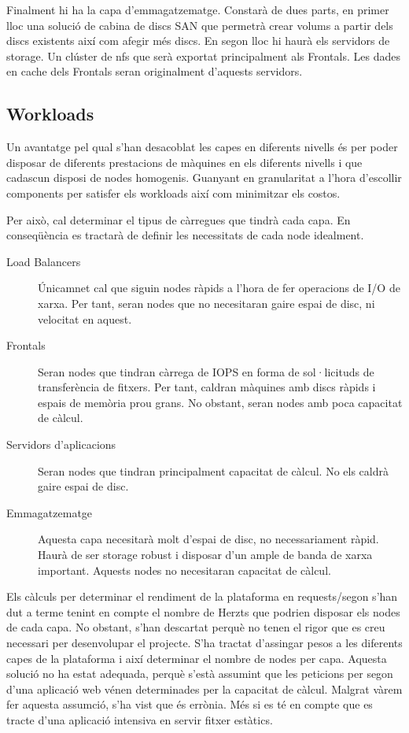 \documentclass[a4paper, 11pt]{article}
\begin{document}
Finalment hi ha la capa d'emmagatzematge. Constarà de dues parts, en primer lloc una solució de cabina de discs SAN que permetrà crear volums a partir dels discs existents així com afegir més discs. En segon lloc hi haurà els servidors de storage. Un clúster de nfs que serà exportat principalment als Frontals. Les dades en cache dels Frontals seran originalment d'aquests servidors.


\subsection{Workloads}

Un avantatge pel qual s'han desacoblat les capes en diferents nivells és per poder disposar de diferents prestacions de màquines en els diferents nivells i que cadascun disposi de nodes homogenis. Guanyant en granularitat a l'hora d'escollir components per satisfer els workloads així com minimitzar els costos.

Per això, cal determinar el tipus de càrregues que tindrà cada capa. En conseqüència es tractarà de definir les necessitats de cada node idealment.

\begin{description}

\item[Load Balancers] Únicamnet cal que siguin nodes ràpids a l'hora de fer operacions de I/O de xarxa. Per tant, seran nodes que no necesitaran gaire espai de disc, ni velocitat en aquest.

\item[Frontals] Seran nodes que tindran càrrega de IOPS en forma de sol·licituds de transferència de fitxers. Per tant, caldran màquines amb discs ràpids i espais de memòria prou grans. No obstant, seran nodes amb poca capacitat de càlcul.

\item[Servidors d'aplicacions]
Seran nodes que tindran principalment capacitat de càlcul. No els caldrà gaire espai de disc.

\item[Emmagatzematge]
Aquesta capa necesitarà molt d'espai de disc, no necessariament ràpid. Haurà de ser storage robust i disposar d'un ample de banda de xarxa important. Aquests nodes no necesitaran capacitat de càlcul.

\end{description}

Els càlculs per determinar el rendiment de la plataforma en requests/segon s'han dut a terme tenint en compte el nombre de Herzts que podrien disposar els nodes de cada capa. No obstant, s'han descartat perquè no tenen el rigor que es creu necessari per desenvolupar el projecte. 
S'ha tractat d'assingar pesos a les diferents capes de la plataforma i així determinar el nombre de nodes per capa. Aquesta solució no ha estat adequada, perquè s'està assumint que les peticions per segon d'una aplicació web vénen determinades per la capacitat de càlcul. Malgrat vàrem fer aquesta assumció, s'ha vist que és errònia. Més si es té en compte que es tracte d'una aplicació intensiva en servir fitxer estàtics.
\end{document}
